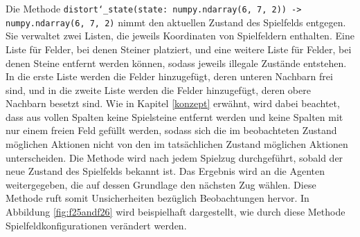 	Die Methode \texttt{distort\char`_state(state: numpy.ndarray(6, 7, 2)) -> numpy.ndarray(6, 7, 2)} nimmt den aktuellen Zustand des Spielfelds entgegen. Sie verwaltet zwei Listen, die jeweils Koordinaten von Spielfeldern enthalten. Eine Liste für Felder, bei denen Steiner platziert, und eine weitere Liste für Felder, bei denen Steine entfernt werden können, sodass jeweils illegale Zustände entstehen. In die erste Liste werden die Felder hinzugefügt, deren unteren Nachbarn frei sind, und in die zweite Liste werden die Felder hinzugefügt, deren obere Nachbarn besetzt sind. Wie in Kapitel \ref{konzept} erwähnt, wird dabei beachtet, dass aus vollen Spalten keine Spielsteine entfernt werden und keine Spalten mit nur einem freien Feld gefüllt werden, sodass sich die im beobachteten Zustand möglichen Aktionen nicht von den im tatsächlichen Zustand möglichen Aktionen unterscheiden. Die Methode wird nach jedem Spielzug durchgeführt, sobald der neue Zustand des Spielfelds bekannt ist. Das Ergebnis wird an die Agenten weitergegeben, die auf dessen Grundlage den nächsten Zug wählen. Diese Methode ruft somit Unsicherheiten bezüglich Beobachtungen hervor. In Abbildung \ref{fig:f25andf26} wird beispielhaft dargestellt, wie durch diese Methode Spielfeldkonfigurationen verändert werden.

\endgroup

